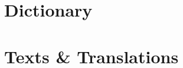 \documentclass[a4paper,11pt,oneside,openany]{memoir}
\begin{document}








\part{Dictionary}



\part{Texts \& Translations}

\end{document}

